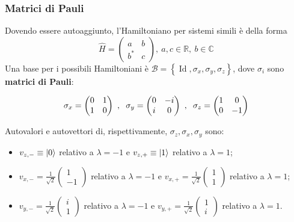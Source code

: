\documentclass[10pt, a4paper]{scrartcl}
\numberwithin{equation}{subsection}
\theoremstyle{style2}
\theoremstyle{style1}
\newenvironment{boxenv}[1][]{
    \begin{eqbox}[#1]
    }{
   \end{eqbox}
}
\begin{document}
\subsubsection{Matrici di Pauli}
Dovendo essere autoaggiunto, l'Hamiltoniano per sistemi simili \`e della forma
\begin{equation}
	\hat{H} = \begin{pmatrix} a & b \\ b^* & c\end{pmatrix}, \ a,c \in \mathbb{R}, \ b \in \mathbb{C}
\end{equation}
Una base per i possibili Hamiltoniani \`e $\mathcal{B} = \left\{ \operatorname{Id} , \sigma_x, \sigma _y, \sigma _z \right\} $, dove $\sigma _i$ sono \textbf{matrici di Pauli}:
\begin{boxenv}[]
\begin{equation}
	\sigma _x = \begin{pmatrix} 0 & 1 \\ 1& 0 \end{pmatrix} \ , \hspace{.2cm} \sigma _y = \begin{pmatrix} 0 & - i \\ i & 0  \end{pmatrix} \ , \hspace{.2cm} \sigma _z = \begin{pmatrix} 1& 0 \\ 0&  -1 \end{pmatrix} 
\end{equation}
\end{boxenv}
\noindent Autovalori e autovettori di, rispettivamente, $\sigma _z, \sigma _x, \sigma _y$ sono:
\begin{itemize}
	\item $v_{z,-}\equiv \ket{0} $ relativo a $\lambda =-1$ e $v_{z,+} \equiv\ket{1} $ relativo a $\lambda = 1$;
	\item $v_{x,-} = \displaystyle \frac{1}{\sqrt{2} } \begin{pmatrix} 1 \\ -1 \end{pmatrix} $ relativo a $\lambda=-1$ e $v_{x,+} = \displaystyle \frac{1}{\sqrt{2} }\begin{pmatrix} 1 \\ 1 \end{pmatrix}  $ relativo a $\lambda = 1$;
	\item $v_{y,-} = \displaystyle \frac{1}{\sqrt{2} }\begin{pmatrix} i \\ 1 \end{pmatrix} $ relativo a $\lambda  = -1$ e $v_{y,+} = \displaystyle \frac{1}{\sqrt{2} } \begin{pmatrix} 1 \\ i \end{pmatrix} $ relativo a $\lambda  = 1 $.
\end{itemize}
\end{document}

